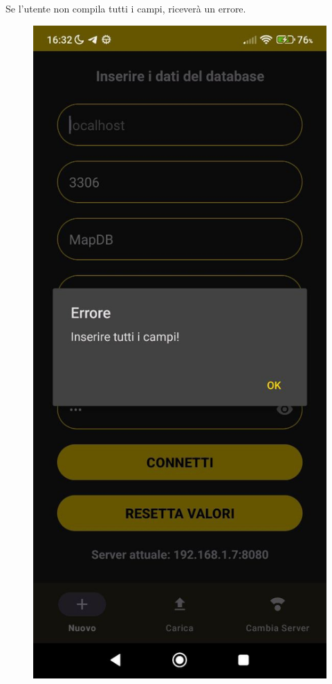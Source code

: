 \begin{enumerate}
\begin{itemize}[label=-]
\begin{figure}[H]
    \end{figure}
    Se l'utente non compila tutti i campi, riceverà un errore.
    \begin{figure}[H]
      \centering
      \includegraphics[scale=0.2]{img/app5.png}

\end{figure}
\end{itemize}
\end{enumerate}
